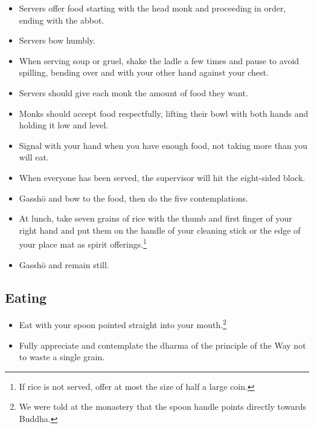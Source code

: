 \documentclass{article}
\begin{document}
\begin{multicols}{2}
\begin{itemize}
\item Servers offer food starting with the head monk and proceeding in
  order, ending with the abbot.
\item Servers bow humbly.
\item When serving soup or gruel, shake the ladle a few times and pause
  to avoid spilling, bending over and with your other hand against your chest.
\item Servers should give each monk the amount of food they want.
\item Monks should accept food respectfully, lifting their bowl with
  both hands and holding it low and level.
\item Signal with your hand when you have enough food, not taking more than
  you will eat.
\item When everyone has been served, the supervisor will hit the eight-sided
  block.
\item Gassh\=o and bow to the food, then do the five contemplations.
\item At lunch, take seven grains of rice with the thumb and first
  finger of your right hand and put them on the handle of your
  cleaning stick or the edge of your place mat as spirit
  offerings.\footnote{If rice is not served, offer at most the size of
    half a large coin.}
\item Gassh\=o and remain still.
\end{itemize}

\subsection{Eating}

\begin{itemize}
\item Eat with your spoon pointed straight into your mouth.\footnote{We
were told at the monastery that the spoon handle points directly towards
Buddha.}
\item Fully appreciate and contemplate the dharma of the principle of the Way
not to waste a single grain.
\end{itemize}


\end{multicols}
\end{document}

